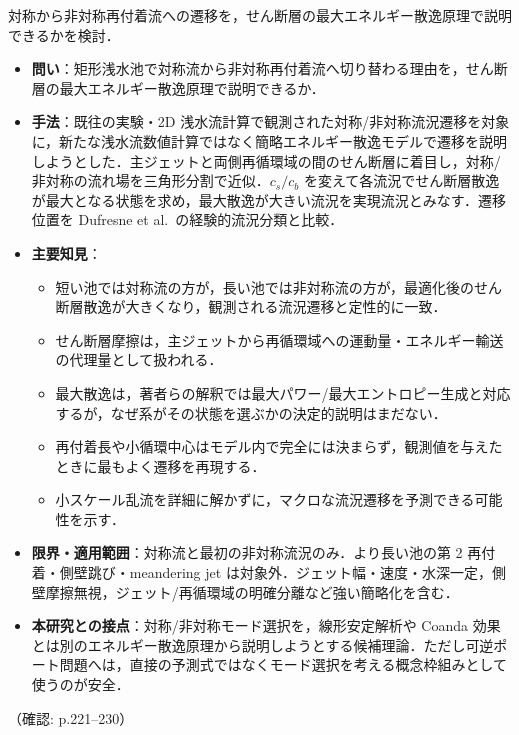 \documentclass[11pt]{jsarticle}
\newcommand{\litref}[1]{{\large\bfseries\color{citecolor}#1}}
\begin{document}
\noindent\litref{Westhoff et al. (2018)}\quad 対称から非対称再付着流への遷移を，せん断層の最大エネルギー散逸原理で説明できるかを検討．
\begin{itemize}
  \item \textbf{問い}：矩形浅水池で対称流から非対称再付着流へ切り替わる理由を，せん断層の最大エネルギー散逸原理で説明できるか．
  \item \textbf{手法}：既往の実験・2D 浅水流計算で観測された対称/非対称流況遷移を対象に，新たな浅水流数値計算ではなく簡略エネルギー散逸モデルで遷移を説明しようとした．主ジェットと両側再循環域の間のせん断層に着目し，対称/非対称の流れ場を三角形分割で近似．$c_s/c_b$ を変えて各流況でせん断層散逸が最大となる状態を求め，最大散逸が大きい流況を実現流況とみなす．遷移位置を Dufresne et al.\ の経験的流況分類と比較．
  \item \textbf{主要知見}：
  \begin{itemize}
    \item 短い池では対称流の方が，長い池では非対称流の方が，最適化後のせん断層散逸が大きくなり，観測される流況遷移と定性的に一致．
    \item せん断層摩擦は，主ジェットから再循環域への運動量・エネルギー輸送の代理量として扱われる．
    \item 最大散逸は，著者らの解釈では最大パワー/最大エントロピー生成と対応するが，なぜ系がその状態を選ぶかの決定的説明はまだない．
    \item 再付着長や小循環中心はモデル内で完全には決まらず，観測値を与えたときに最もよく遷移を再現する．
    \item 小スケール乱流を詳細に解かずに，マクロな流況遷移を予測できる可能性を示す．
  \end{itemize}
  \item \textbf{限界・適用範囲}：対称流と最初の非対称流況のみ．より長い池の第 2 再付着・側壁跳び・meandering jet は対象外．ジェット幅・速度・水深一定，側壁摩擦無視，ジェット/再循環域の明確分離など強い簡略化を含む．
  \item \textbf{本研究との接点}：対称/非対称モード選択を，線形安定解析や Coanda 効果とは別のエネルギー散逸原理から説明しようとする候補理論．ただし可逆ポート問題へは，直接の予測式ではなくモード選択を考える概念枠組みとして使うのが安全．
\end{itemize}
\noindent（確認: p.221--230）
\end{document}
